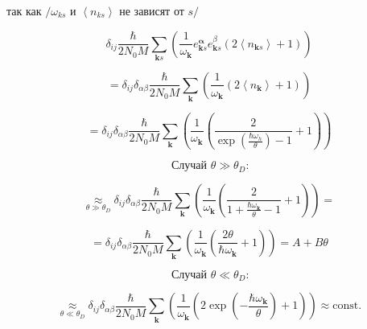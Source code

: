 \documentclass[a4paper,12pt]{article} %
\begin{document}
\begin{task}
так как $/ \omega_{k s}$ и $\left\langle n_{k s}\right\rangle$ не зависят от $s /$



$$
\delta_{i j} \frac{\hbar}{2 N_{0} M} \sum_{\boldsymbol{k} s}\left(\frac{1}{\omega_{\boldsymbol{k}}} e_{\boldsymbol{k} s}^{\boldsymbol{\alpha}} e_{\boldsymbol{k} s}^{\beta}\left(2\left\langle n_{\boldsymbol{k} s}\right\rangle+1\right)\right)
$$



$$
=\delta_{i j} \delta_{\alpha \beta} \frac{\hbar}{2 N_{0} M} \sum_{\boldsymbol{k}}\left(\frac{1}{\omega_{\boldsymbol{k}}}\left(2\left\langle n_{\boldsymbol{k}}\right\rangle+1\right)\right)
$$



$$
=\delta_{i j} \delta_{\alpha \beta} \frac{\hbar}{2 N_{0} M} \sum_{\boldsymbol{k}}\left(\frac{1}{\omega_{\boldsymbol{k}}}\left(\frac{2}{\exp \left(\frac{\hbar \omega_{h}}{\theta}\right)-1}+1\right)\right)
$$









$$
\text { Случай } \theta \gg \theta_{D}:
$$




$$
\underset{\theta \gg \theta_{D}}{\approx} \delta_{i j} \delta_{\alpha \beta} \frac{\hbar}{2 N_{0} M} \sum_{\boldsymbol{k}}\left(\frac{1}{\omega_{\boldsymbol{k}}}\left(\frac{2}{1+\frac{\hbar \omega_{\boldsymbol{k}}}{\theta}-1}+1\right)\right)=
$$


$$
=\delta_{i j} \delta_{\alpha \beta} \frac{\hbar}{2 N_{0} M} \sum_{\boldsymbol{k}}\left(\frac{1}{\omega_{\boldsymbol{k}}}\left(\frac{2 \theta}{\hbar \omega_{\boldsymbol{k}}}+1\right)\right)=A+B \theta
$$




















$$
\text { Случай } \theta \ll \theta_{D}:
$$




$$
\underset{\theta \ll \theta_{D}}{\approx} \delta_{i j} \delta_{\alpha \beta} \frac{\hbar}{2 N_{0} M} \sum_{\boldsymbol{k}}\left(\frac{1}{\omega_{\boldsymbol{k}}}\left(2 \exp \left(-\frac{\hbar \omega_{\boldsymbol{k}}}{\theta}\right)+1\right)\right) \approx \text {const.}
$$





















\end{task}
\end{document}
